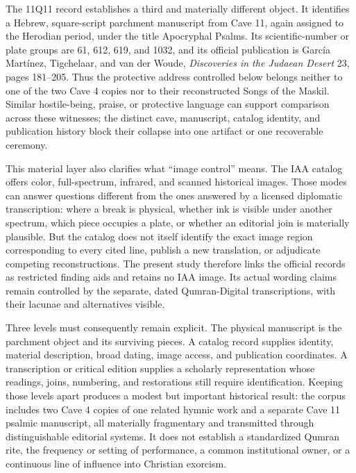 The 11Q11 record establishes a third and materially different object. It
identifies a Hebrew, square-script parchment manuscript from Cave 11, again
assigned to the Herodian period, under the title Apocryphal Psalms. Its
scientific-number or plate groups are 61, 612, 619, and 1032, and its official
publication is García Martínez, Tigchelaar, and van der Woude,
\emph{Discoveries in the Judaean Desert} 23, pages 181--205. Thus the
protective address controlled below belongs neither to one of the two Cave 4
copies nor to their reconstructed Songs of the Maskil. Similar hostile-being,
praise, or protective language can support comparison across these witnesses;
the distinct cave, manuscript, catalog identity, and publication history block
their collapse into one artifact or one recoverable ceremony.

This material layer also clarifies what ``image control'' means. The IAA
catalog offers color, full-spectrum, infrared, and scanned historical images.
Those modes can answer questions different from the ones answered by a
licensed diplomatic transcription: where a break is physical, whether ink is
visible under another spectrum, which piece occupies a plate, or whether an
editorial join is materially plausible. But the catalog does not itself
identify the exact image region corresponding to every cited line, publish a
new translation, or adjudicate competing reconstructions. The present study
therefore links the official records as restricted finding aids and retains no
IAA image. Its actual wording claims remain controlled by the separate,
dated Qumran-Digital transcriptions, with their lacunae and alternatives
visible.

Three levels must consequently remain explicit. The physical manuscript is
the parchment object and its surviving pieces. A catalog record supplies
identity, material description, broad dating, image access, and publication
coordinates. A transcription or critical edition supplies a scholarly
representation whose readings, joins, numbering, and restorations still
require identification. Keeping those levels apart produces a modest but
important historical result: the corpus includes two Cave 4 copies of one
related hymnic work and a separate Cave 11 psalmic manuscript, all materially
fragmentary and transmitted through distinguishable editorial systems. It
does not establish a standardized Qumran rite, the frequency or setting of
performance, a common institutional owner, or a continuous line of influence
into Christian exorcism.

